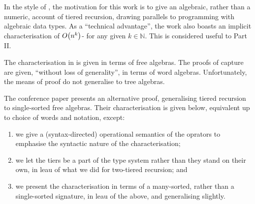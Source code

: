 In the style of \cite{leivant-1990}, the motivation for this work is to give an
algebraic, rather than a numeric, account of tiered recursion, drawing
parallels to programming with algebraic data types. As a ``technical
advantage'', the work also boasts an implicit characterisation of
$O{\mathopen{}\left({n^k}\right)\mathclose{}}$-\TIME{} for any given $k\in \mathbb{N}$. This is considered useful
to Part II.

The characterisation in \cite{leivant-1995} is given in terms of free algebras.
The proofs of capture are given, ``without loss of generality'', in terms of
word algebras. Unfortunately, the means of proof do not generalise to tree
algebras\cite{caseiro-1996, dal-lago-et-al-2010}.

The conference paper \cite{dal-lago-et-al-2010} presents an alternative proof,
generalising tiered recursion to single-sorted free algebras. Their
characterisation is given below, equivalent up to choice of words and notation,
except:

\begin{enumerate}[label=(\arabic*)]

\item we give a (syntax-directed) operational semantics of the oprators to
emphasise the syntactic nature of the characterisation;

\item we let the tiers be a part of the type system rather than they stand on
their own, in leau of what we did for two-tiered recursion; and

\item we present the characterisation in terms of a many-sorted, rather than a
single-sorted signature, in leau of the above, and generalising slightly.

\end{enumerate}

